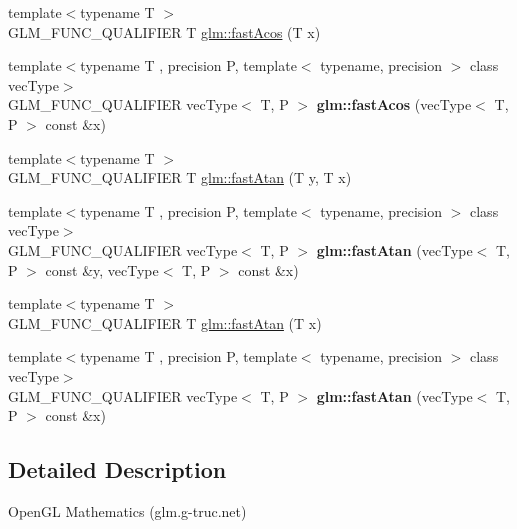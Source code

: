 \begin{DoxyCompactItemize}
\item 
{\footnotesize template$<$typename T $>$ }\\G\-L\-M\-\_\-\-F\-U\-N\-C\-\_\-\-Q\-U\-A\-L\-I\-F\-I\-E\-R T \hyperlink{group__gtx__fast__trigonometry_ga9721d63356e5d94fdc4b393a426ab26b}{glm\-::fast\-Acos} (T x)
\item 
\hypertarget{namespaceglm_a297ec5f203c6fec20424ef3703771067}{{\footnotesize template$<$typename T , precision P, template$<$ typename, precision $>$ class vec\-Type$>$ }\\G\-L\-M\-\_\-\-F\-U\-N\-C\-\_\-\-Q\-U\-A\-L\-I\-F\-I\-E\-R vec\-Type$<$ T, P $>$ {\bfseries glm\-::fast\-Acos} (vec\-Type$<$ T, P $>$ const \&x)}\label{namespaceglm_a297ec5f203c6fec20424ef3703771067}

\item 
{\footnotesize template$<$typename T $>$ }\\G\-L\-M\-\_\-\-F\-U\-N\-C\-\_\-\-Q\-U\-A\-L\-I\-F\-I\-E\-R T \hyperlink{group__gtx__fast__trigonometry_ga8d197c6ef564f5e5d59af3b3f8adcc2c}{glm\-::fast\-Atan} (T y, T x)
\item 
\hypertarget{namespaceglm_ae44077649af44bfe95fab2d4576c5dbe}{{\footnotesize template$<$typename T , precision P, template$<$ typename, precision $>$ class vec\-Type$>$ }\\G\-L\-M\-\_\-\-F\-U\-N\-C\-\_\-\-Q\-U\-A\-L\-I\-F\-I\-E\-R vec\-Type$<$ T, P $>$ {\bfseries glm\-::fast\-Atan} (vec\-Type$<$ T, P $>$ const \&y, vec\-Type$<$ T, P $>$ const \&x)}\label{namespaceglm_ae44077649af44bfe95fab2d4576c5dbe}

\item 
{\footnotesize template$<$typename T $>$ }\\G\-L\-M\-\_\-\-F\-U\-N\-C\-\_\-\-Q\-U\-A\-L\-I\-F\-I\-E\-R T \hyperlink{group__gtx__fast__trigonometry_gae25de86a968490ff56856fa425ec9d30}{glm\-::fast\-Atan} (T x)
\item 
\hypertarget{namespaceglm_a89520a2015e9c9f5b1a202e7e4dcc7ea}{{\footnotesize template$<$typename T , precision P, template$<$ typename, precision $>$ class vec\-Type$>$ }\\G\-L\-M\-\_\-\-F\-U\-N\-C\-\_\-\-Q\-U\-A\-L\-I\-F\-I\-E\-R vec\-Type$<$ T, P $>$ {\bfseries glm\-::fast\-Atan} (vec\-Type$<$ T, P $>$ const \&x)}\label{namespaceglm_a89520a2015e9c9f5b1a202e7e4dcc7ea}

\end{DoxyCompactItemize}


\subsection{Detailed Description}
Open\-G\-L Mathematics (glm.\-g-\/truc.\-net)

